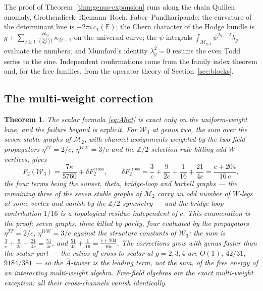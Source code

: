 \documentclass[11pt]{amsart}
\numberwithin{equation}{section}
\theoremstyle{plain}
\newtheorem{theorem}{Theorem}[section]
\theoremstyle{definition}
\theoremstyle{remark}
\newcommand{\cM}{\mathcal{M}}
\newcommand{\cW}{\mathcal{W}}
\newcommand{\bZ}{\mathbb{Z}}
\newcommand{\bE}{\mathbb{E}}
\newcommand{\Mbar}{\overline{\cM}}
\begin{document}
The proof of Theorem~\ref{thm:genus-expansion} runs along the chain
Quillen anomaly, Grothendieck--Riemann--Roch, Faber--Pandharipande:
the curvature of the determinant line is $-2\pi i\,c_1(\bE)$; the
Chern character of the Hodge bundle is
$g+\sum_{j\geq1}\frac{B_{2j}}{(2j)!}\,\kappa_{2j-1}$ on the
universal curve; the $\psi$-integrals
$\int_{\Mbar_{g,1}}\psi^{2g-2}\lambda_g$ evaluate the numbers; and
Mumford's identity $\lambda_g^{2}=0$ resums the even Todd series to
the sine. Independent confirmations come from the family index
theorem and, for the free families, from the operator theory of
Section~\ref{sec:blocks}.


\subsection{The multi-weight correction}

\begin{theorem}\label{thm:multiweight}
The scalar formula \eqref{eq:Ahat} is exact only on the uniform-weight
lane, and the failure beyond is explicit. For $\cW_3$ at genus two, the
sum over the seven stable graphs of $\Mbar_2$, with channel assignments
weighted by the two-field propagators $\eta^{TT}=2/c$, $\eta^{WW}=3/c$
and the $\bZ/2$ selection rule killing odd-$W$ vertices, gives
\begin{equation}\label{eq:cross}
F_2(\cW_3)
=\frac{7\kappa}{5760}
+\delta F_2^{\mathrm{cross}},
\qquad
\delta F_2^{\mathrm{cross}}
=\frac{3}{c}+\frac{9}{2c}+\frac{1}{16}+\frac{21}{4c}
=\frac{c+204}{16\,c},
\end{equation}
the four terms being the sunset, theta, bridge-loop and barbell
graphs --- the remaining three of the seven stable graphs of
$\Mbar_2$ carry an odd number of $W$-legs at some vertex and vanish
by the $\bZ/2$ symmetry --- and the bridge-loop contribution $1/16$
is a topological residue independent of $c$. This enumeration is the
proof: seven graphs, three killed by parity, four evaluated by the
propagators $\eta^{TT}=2/c$, $\eta^{WW}=3/c$ against the structure
constants of $\cW_3$: the sum is
$\tfrac3c+\tfrac9{2c}+\tfrac{21}{4c}=\tfrac{51}{4c}$, and
$\tfrac{51}{4c}+\tfrac1{16}=\tfrac{c+204}{16c}$. The corrections grow with genus faster than the scalar part
--- the ratios of cross to scalar at $g=2,3,4$ are
$O(1)$, $42/31$, $9184/381$ --- so the $\widehat{A}$-tower is the
leading term, not the sum, of the free energy of an interacting
multi-weight algebra. Free-field algebras are the exact multi-weight
exception: all their cross-channels vanish identically.
\end{theorem}
\end{document}
